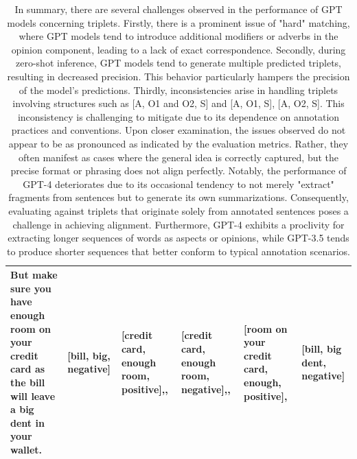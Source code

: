 \documentclass[11pt]{article}
\begin{document}
\begin{table}
{\begin{tabular}{p{5cm}@{\hskip 0.5cm}p{3cm}@{\hskip 0.5cm}p{3cm}@{\hskip 0.5cm}p{3cm}@{\hskip 0.5cm}p{3cm}@{\hskip 0.5cm}p{3cm}}
But make sure you have enough room on your credit card as the bill will leave a big dent in your wallet. & [bill, big, negative] & [credit card, enough room, positive],, & [credit card, enough room, negative],, & [room on your credit card, enough, positive], & [bill, big dent, negative] \\ \bottomrule
\end{tabular}
}

\caption{In summary, there are several challenges observed in the performance of GPT models concerning triplets. Firstly, there is a prominent issue of "hard" matching, where GPT models tend to introduce additional modifiers or adverbs in the opinion component, leading to a lack of exact correspondence. Secondly, during zero-shot inference, GPT models tend to generate multiple predicted triplets, resulting in decreased precision. This behavior particularly hampers the precision of the model's predictions. Thirdly, inconsistencies arise in handling triplets involving structures such as [A, O1 and O2, S] and [A, O1, S], [A, O2, S]. This inconsistency is challenging to mitigate due to its dependence on annotation practices and conventions.
Upon closer examination, the issues observed do not appear to be as pronounced as indicated by the evaluation metrics. Rather, they often manifest as cases where the general idea is correctly captured, but the precise format or phrasing does not align perfectly. Notably, the performance of GPT-4 deteriorates due to its occasional tendency to not merely "extract" fragments from sentences but to generate its own summarizations. Consequently, evaluating against triplets that originate solely from annotated sentences poses a challenge in achieving alignment. Furthermore, GPT-4 exhibits a proclivity for extracting longer sequences of words as aspects or opinions, while GPT-3.5 tends to produce shorter sequences that better conform to typical annotation scenarios.}
\label{tab:gptExample}
\end{table}
\end{document}
